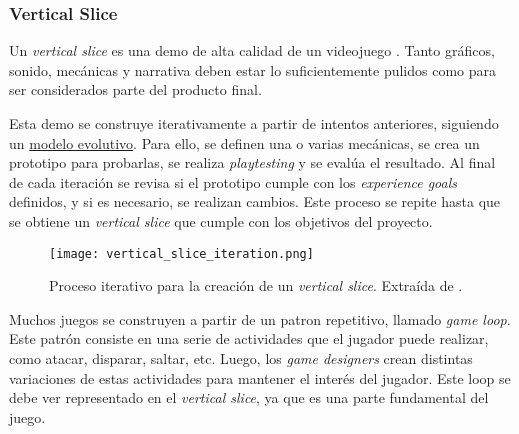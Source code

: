 \subsubsection{Vertical Slice}
Un \textit{vertical slice} es una demo de alta calidad de un videojuego \cite{lemarchandPlayfulProductionProcess2021}. Tanto gráficos, sonido, mecánicas y narrativa deben estar lo suficientemente pulidos como para ser considerados parte del producto final. 
\par Esta demo se construye iterativamente a partir de intentos anteriores, siguiendo un \hyperref[sec:modelos_evolutivos]{modelo evolutivo}. Para ello, se definen una  o varias mecánicas, se crea un prototipo para probarlas, se realiza \textit{playtesting} y se evalúa el resultado. Al final de cada iteración se revisa si el prototipo cumple con los \textit{experience goals} definidos, y si es necesario, se realizan cambios. Este proceso se repite hasta que se obtiene un \textit{vertical slice} que cumple con los objetivos del proyecto.
\begin{figure}[h]
    \centering
    \texttt{[image: vertical\_slice\_iteration.png]}
    \caption{Proceso iterativo para la creación de un \textit{vertical slice}. Extraída de \cite{lemarchandPlayfulProductionProcess2021}.}
    \label{fig:x iteracion vertical slice}
\end{figure} 
\par Muchos juegos se construyen a partir de un patron repetitivo, llamado \textit{game loop}. Este patrón consiste en una serie de actividades que el jugador puede realizar, como atacar, disparar, saltar, etc. Luego, los \textit{game designers} crean distintas variaciones de estas actividades para mantener el interés del jugador. Este loop se debe ver representado en el \textit{vertical slice}, ya que es una parte fundamental del juego.
%
